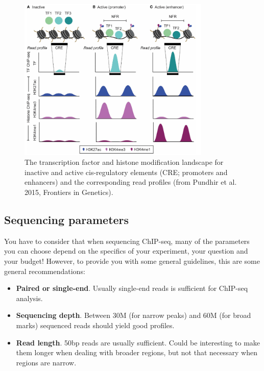 \documentclass[]{article}
\providecommand{\tightlist}{%
  \setlength{\itemsep}{0pt}\setlength{\parskip}{0pt}}
\begin{document}
\begin{figure}

{\centering \includegraphics[width=3.6in]{img/tf_histone_cres} 

}

\caption{The transcription factor and histone modification landscape for inactive and active cis-regulatory elements (CRE; promoters and enhancers) and the corresponding read profiles (from Pundhir et al. 2015, Frontiers in Genetics).}\label{fig:landscape}
\end{figure}

\subsection{Sequencing parameters}\label{sequencing-parameters}

You have to consider that when sequencing ChIP-seq, many of the
parameters you can choose depend on the specifics of your experiment,
your question and your budget! However, to provide you with some general
guidelines, this are some general recommendations:

\begin{itemize}
\tightlist
\item
  \textbf{Paired or single-end}. Usually single-end reads is sufficient
  for ChIP-seq analysis.
\item
  \textbf{Sequencing depth}. Between 30M (for narrow peaks) and 60M (for
  broad marks) sequenced reads should yield good profiles.
\item
  \textbf{Read length}. 50bp reads are usually sufficient. Could be
  interesting to make them longer when dealing with broader regions, but
  not that necessary when regions are narrow.
\end{itemize}
\end{document}
